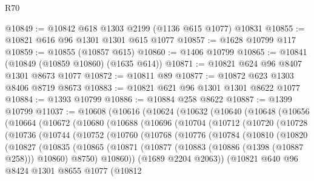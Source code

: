 \begin{lexlean}{R70}
\begin{coremodule}
@10849 := @10842 @618 @1303 @2199 (@1136 @615 @1077) @10831
@10855 := @10821 @616 @96 @1301 @1301 @615 @1077
@10857 := @1628 @10799 @117
@10859 := @10855 (@10857 @615)
@10860 := @1406 @10799
@10865 := @10841 (@10849 (@10859 @10860) (@1635 @614))
@10871 := @10821 @624 @96 @8407 @1301 @8673 @1077
@10872 := @10811 @89
@10877 := @10872 @623 @1303 @8406 @8719 @8673
@10883 := @10821 @621 @96 @1301 @1301 @8622 @1077
@10884 := @1393 @10799
@10886 := @10884 @258 @8622
@10887 := @1399 @10799
@11037 := @10608
    (@10616
      (@10624
        (@10632
          (@10640
            (@10648
              (@10656
                (@10664
                  (@10672
                    (@10680
                      (@10688
                        (@10696
                          (@10704
                            (@10712
                              (@10720
                                (@10728
                                  (@10736
                                    (@10744
                                      (@10752
                                        (@10760
                                          (@10768
                                            (@10776
                                              (@10784
                                                (@10810
                                                  (@10820
                                                    (@10827
                                                      (@10835
                                                        (@10865
                                                          (@10871
                                                            (@10877
                                                              (@10883
                                                                (@10886 (@1398 (@10887 @258)))
                                                                @10860)
                                                              @8750)
                                                            @10860))
                                                        (@1689 @2204 @2063))
                                                      (@10821
                                                        @640
                                                        @96
                                                        @8424
                                                        @1301
                                                        @8655
                                                        @1077
                                                        (@10812

\end{coremodule}
\end{lexlean}
